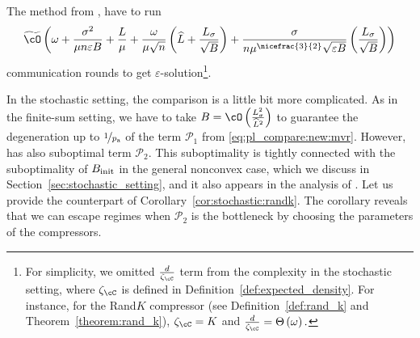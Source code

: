 \documentclass{article}
\newcommand{\algorithmname}{DASHA-PP}
\newcommand*{\probavailable}{\ensuremath{p_{\textnormal{a}}}}
\begin{document}
The method  from \citep{tyurin2022dasha}, have to run
\begin{align}
  \label{eq:pl_compare:old:mvr}
  \widetilde{\cO}\left(\omega + \frac{\sigma^2}{\mu n \varepsilon B} + \frac{L}{\mu} + \frac{\omega}{\mu \sqrt{n}} \left(\widehat{L} + \frac{L_{\sigma}}{\sqrt{B}}\right) + \frac{\sigma}{n \mu^{\nicefrac{3}{2}} \sqrt{\varepsilon B}}\left(\frac{L_{\sigma}}{\sqrt{B}}\right)\right)
\end{align}
communication rounds to get $\varepsilon$-solution\footnote{For simplicity, we omitted $\frac{d}{\zeta_{\cC}}$ term from the complexity in the stochastic setting, where $\zeta_{\cC}$ is defined in Definition~\ref{def:expected_density}. For instance, for the Rand$K$ compressor (see Definition~\ref{def:rand_k} and Theorem~\ref{theorem:rand_k}), $\zeta_{\cC} = K$ and $\frac{d}{\zeta_{\cC}} = \Theta\left(\omega\right).$}.

In the stochastic setting, the comparison is a little bit more complicated. As in the finite-sum setting, we have to take 
$B = \cO\left(\frac{L_{\sigma}^2}{\widehat{L}^2}\right)$ to guarantee the degeneration up to $\nicefrac{1}{\probavailable}$ of the term $\mathcal{P}_1$ from \eqref{eq:pl_compare:new:mvr}. However, \algname{\algorithmname-MVR} has also suboptimal term $\mathcal{P}_2$. This suboptimality is tightly connected with the suboptimality of $B_{\textnormal{init}}$ in the general nonconvex case, which we discuss in Section~\ref{sec:stochastic_setting}, and it also appears in the analysis of  \citep{tyurin2022dasha}. Let us provide the counterpart of Corollary~\ref{cor:stochastic:randk}. The corollary reveals that we can escape regimes when $\mathcal{P}_2$ is the bottleneck by choosing the parameters of the compressors.
\end{document}
